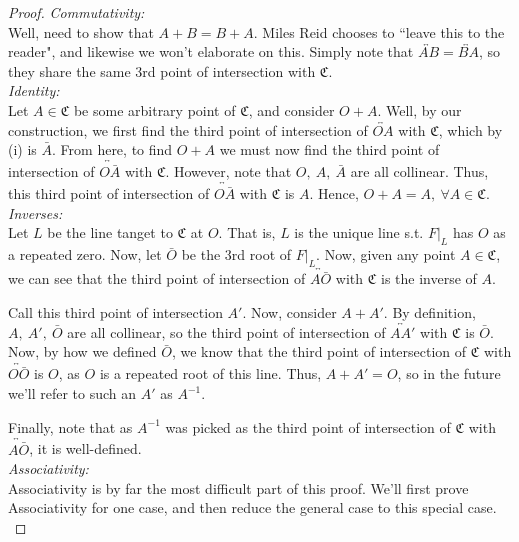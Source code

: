 \begin{proof}
\emph{Commutativity:}\\
Well, need to show that $A+B = B+A$. Miles Reid chooses to ``leave this to the reader", 
and likewise we won't elaborate on this. Simply note that $\overleftrightarrow{AB} = \overleftrightarrow{BA}$,
so they share the same 3rd point of intersection with $\mathfrak{C}$.\\

\emph{Identity:}\\
Let $A \in \mathfrak{C}$ be some arbitrary point of $\mathfrak{C}$, and consider $O+A$.
Well, by our construction, we first find the third point
of intersection of $\overleftrightarrow{OA}$ with $\mathfrak{C}$, which by (i)
is $\bar{A}$. From here, to find $O+A$ we must now find the
third point of intersection of $\overleftrightarrow{O\bar{A}}$ with $\mathfrak{C}$. However, note
that $O,~A,~\bar{A}$ are all collinear. Thus, this third point
of intersection of $\overleftrightarrow{O\bar{A}}$ with $\mathfrak{C}$ is $A$. Hence, $O+A=A,~\forall A \in \mathfrak{C}$.\\

\emph{Inverses:}\\
Let $L$ be the line tanget to $\mathfrak{C}$ at $O$. That is, $L$ is the unique line s.t.
$F|_L$ has $O$ as a repeated zero. Now, let $\bar{O}$ be the 3rd root of $F|_L$.
Now, given any point $A \in \mathfrak{C}$, we can see that the third point of intersection
of $\overleftrightarrow{A\bar{O}}$ with $\mathfrak{C}$ is the inverse of $A$.

Call this third point of intersection $A'$. Now, consider $A+A'$. By definition,
$A,~A',~\bar{O}$ are all collinear, so the third point of intersection of 
$\overleftrightarrow{AA'}$ with $\mathfrak{C}$ is $\bar{O}$. Now, by how we defined
$\bar{O}$, we know that the third point of intersection of $\mathfrak{C}$ with $\overleftrightarrow{O\bar{O}}$
is $O$, as $O$ is a repeated root of this line. Thus, $A+A' = O$, so in the
future we'll refer to such an $A'$ as $A^{-1}$.

Finally, note that as $A^{-1}$ was picked as the third point of intersection of
$\mathfrak{C}$ with $\overleftrightarrow{A\bar{O}}$, it is well-defined.\\

\emph{Associativity:}\\
Associativity is by far the most difficult part of this proof. We'll first prove 
Associativity for one case, and then reduce the general case to this special case.\\


\end{proof}
